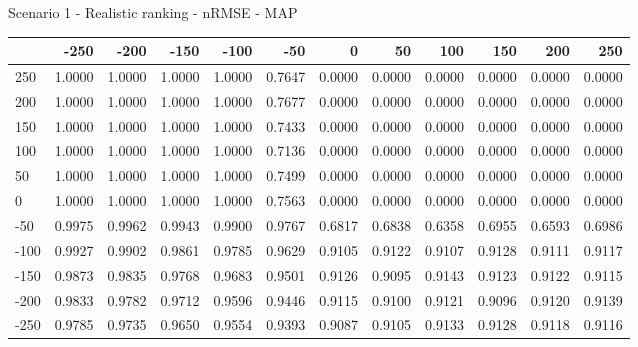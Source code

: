 Scenario 1 - Realistic ranking - nRMSE - MAP
\begin{tabular}{lrrrrrrrrrrr}
\toprule
{} &   -250 &   -200 &   -150 &   -100 &   -50  &    0   &    50  &    100 &    150 &    200 &    250 \\
\midrule
 250 & 1.0000 & 1.0000 & 1.0000 & 1.0000 & 0.7647 & 0.0000 & 0.0000 & 0.0000 & 0.0000 & 0.0000 & 0.0000 \\
 200 & 1.0000 & 1.0000 & 1.0000 & 1.0000 & 0.7677 & 0.0000 & 0.0000 & 0.0000 & 0.0000 & 0.0000 & 0.0000 \\
 150 & 1.0000 & 1.0000 & 1.0000 & 1.0000 & 0.7433 & 0.0000 & 0.0000 & 0.0000 & 0.0000 & 0.0000 & 0.0000 \\
 100 & 1.0000 & 1.0000 & 1.0000 & 1.0000 & 0.7136 & 0.0000 & 0.0000 & 0.0000 & 0.0000 & 0.0000 & 0.0000 \\
 50  & 1.0000 & 1.0000 & 1.0000 & 1.0000 & 0.7499 & 0.0000 & 0.0000 & 0.0000 & 0.0000 & 0.0000 & 0.0000 \\
 0   & 1.0000 & 1.0000 & 1.0000 & 1.0000 & 0.7563 & 0.0000 & 0.0000 & 0.0000 & 0.0000 & 0.0000 & 0.0000 \\
-50  & 0.9975 & 0.9962 & 0.9943 & 0.9900 & 0.9767 & 0.6817 & 0.6838 & 0.6358 & 0.6955 & 0.6593 & 0.6986 \\
-100 & 0.9927 & 0.9902 & 0.9861 & 0.9785 & 0.9629 & 0.9105 & 0.9122 & 0.9107 & 0.9128 & 0.9111 & 0.9117 \\
-150 & 0.9873 & 0.9835 & 0.9768 & 0.9683 & 0.9501 & 0.9126 & 0.9095 & 0.9143 & 0.9123 & 0.9122 & 0.9115 \\
-200 & 0.9833 & 0.9782 & 0.9712 & 0.9596 & 0.9446 & 0.9115 & 0.9100 & 0.9121 & 0.9096 & 0.9120 & 0.9139 \\
-250 & 0.9785 & 0.9735 & 0.9650 & 0.9554 & 0.9393 & 0.9087 & 0.9105 & 0.9133 & 0.9128 & 0.9118 & 0.9116 \\
\bottomrule
\end{tabular}

